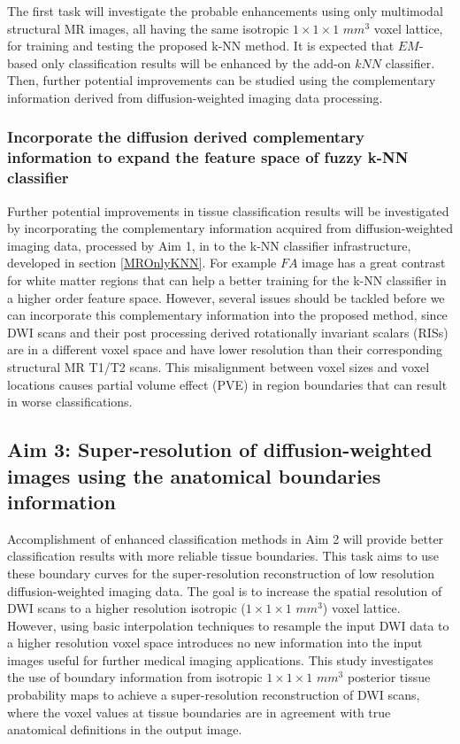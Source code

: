 \noindent The first task will investigate the probable enhancements using only multimodal structural MR images, all having the same isotropic $1\times1\times1$ $mm^3$ voxel lattice, for training and testing the proposed k-NN method. It is expected that $EM$-based only classification results will be enhanced by the add-on $kNN$ classifier. Then, further potential improvements can be studied using the complementary information derived from diffusion-weighted imaging data processing.

\subsubsection{Incorporate the diffusion derived complementary information to expand the feature space of fuzzy k-NN classifier}
Further potential improvements in tissue classification results will be investigated by incorporating the complementary information acquired from diffusion-weighted imaging data, processed by Aim 1, in to the k-NN classifier infrastructure, developed in section \ref{MROnlyKNN}. For example $FA$ image has a great contrast for white matter regions that can help a better training for the k-NN classifier in a higher order feature space. However, several issues should be tackled before we can incorporate this complementary information into the proposed method, since DWI scans and their post processing derived rotationally invariant scalars (RISs) are in a different voxel space and have lower resolution than their corresponding structural MR T1/T2 scans. This misalignment between voxel sizes and voxel locations causes partial volume effect (PVE) in region boundaries that can result in worse classifications.
\newline

\subsection{Aim 3: Super-resolution of diffusion-weighted images using the anatomical boundaries information}
Accomplishment of enhanced classification methods in Aim 2 will provide better classification results with more reliable tissue boundaries. This task aims to use these boundary curves for the super-resolution reconstruction of low resolution diffusion-weighted imaging data.
The goal is to increase the spatial resolution of DWI scans to a higher resolution isotropic ($1\times1\times1$ $mm^3$) voxel lattice. However, using basic interpolation techniques to resample the input DWI data to a higher resolution voxel space introduces no new information into the input images useful for further medical imaging applications. This study investigates the use of boundary information from isotropic $1\times1\times1$ $mm^3$ posterior tissue probability maps to achieve a super-resolution reconstruction of DWI scans, where the voxel values at tissue boundaries are in agreement with true anatomical definitions in the output image.
\newline
